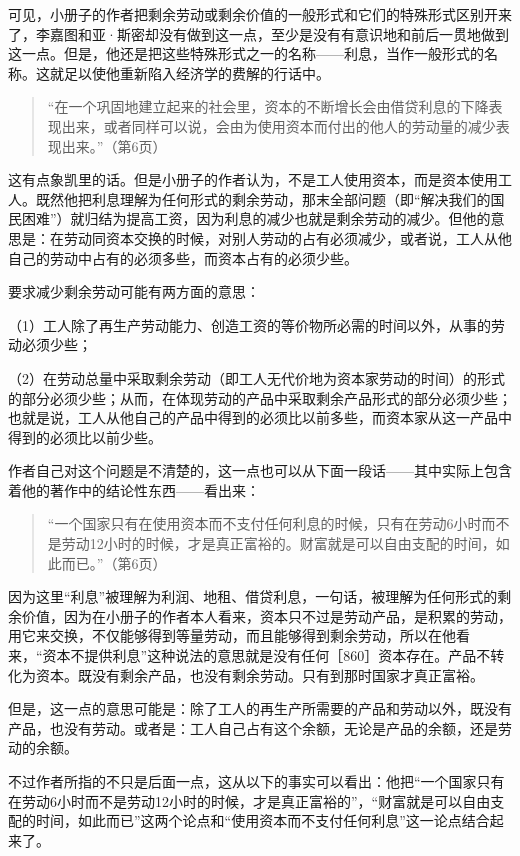 可见，小册子的作者把剩余劳动或剩余价值的一般形式和它们的特殊形式区别开来了，李嘉图和亚·斯密却没有做到这一点，至少是没有有意识地和前后一贯地做到这一点。但是，他还是把这些特殊形式之一的名称——利息，当作一般形式的名称。这就足以使他重新陷入经济学的费解的行话中。

\begin{quote}{“在一个巩固地建立起来的社会里，资本的不断增长会由借贷利息的下降表现出来，或者同样可以说，会由为使用资本而付出的他人的劳动量的减少表现出来。”（第6页）}\end{quote}

这有点象凯里的话。但是小册子的作者认为，不是工人使用资本，而是资本使用工人。既然他把利息理解为任何形式的剩余劳动，那末全部问题（即“解决我们的国民困难”）就归结为提高工资，因为利息的减少也就是剩余劳动的减少。但他的意思是：在劳动同资本交换的时候，对别人劳动的占有必须减少，或者说，工人从他自己的劳动中占有的必须多些，而资本占有的必须少些。

要求减少剩余劳动可能有两方面的意思：

（1）工人除了再生产劳动能力、创造工资的等价物所必需的时间以外，从事的劳动必须少些；

（2）在劳动总量中采取剩余劳动（即工人无代价地为资本家劳动的时间）的形式的部分必须少些；从而，在体现劳动的产品中采取剩余产品形式的部分必须少些；也就是说，工人从他自己的产品中得到的必须比以前多些，而资本家从这一产品中得到的必须比以前少些。

作者自己对这个问题是不清楚的，这一点也可以从下面一段话——其中实际上包含着他的著作中的结论性东西——看出来：

\begin{quote}{“一个国家只有在使用资本而不支付任何利息的时候，只有在劳动6小时而不是劳动12小时的时候，才是真正富裕的。财富就是可以自由支配的时间，如此而已。”（第6页）}\end{quote}

因为这里“利息”被理解为利润、地租、借贷利息，一句话，被理解为任何形式的剩余价值，因为在小册子的作者本人看来，资本只不过是劳动产品，是积累的劳动，用它来交换，不仅能够得到等量劳动，而且能够得到剩余劳动，所以在他看来，“资本不提供利息”这种说法的意思就是没有任何［860］资本存在。产品不转化为资本。既没有剩余产品，也没有剩余劳动。只有到那时国家才真正富裕。

但是，这一点的意思可能是：除了工人的再生产所需要的产品和劳动以外，既没有产品，也没有劳动。或者是：工人自己占有这个余额，无论是产品的余额，还是劳动的余额。

不过作者所指的不只是后面一点，这从以下的事实可以看出：他把“一个国家只有在劳动6小时而不是劳动12小时的时候，才是真正富裕的”，“财富就是可以自由支配的时间，如此而已”这两个论点和“使用资本而不支付任何利息”这一论点结合起来了。


